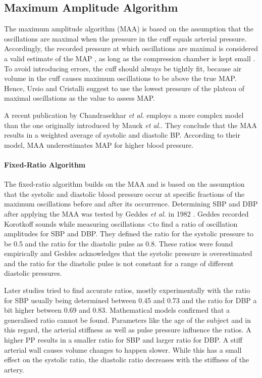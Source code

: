 \subsection{Maximum Amplitude Algorithm}
The maximum amplitude algorithm (MAA) is based on the assumption that the oscillations are maximal when the pressure in the cuff equals arterial pressure. Accordingly, the recorded pressure at which oscillations are maximal is considered a valid estimate of the MAP \cite{Babbs2012,Geddes1982,Drzewiecki1994}\cite{Ramsey1979}, as long as the compression chamber is kept small \cite{Mauck1980}. To avoid introducing errors, the cuff should always be tightly fit, because air volume in the cuff causes maximum oscillations to be above the true MAP. Hence, Ursio and Cristalli suggest to use the lowest pressure of the plateau of maximal oscillations as the value to assess MAP.\cite{Ursino1996}

A recent publication by Chandrasekhar \textit{et al.} \cite{Chandrasekhar2019} employs a more complex model than the one originally introduced by Mauck \textit{et al.}\cite{Mauck1980}. They conclude that the MAA results in a weighted average of systolic and diastolic BP. According to their model, MAA underestimates MAP for higher blood pressure.

\paragraph{Fixed-Ratio Algorithm} The fixed-ratio algorithm builds on the MAA and is based on the assumption that the systolic and diastolic blood pressure occur at specific fractions of the maximum oscillations before and after its occurrence. Determining SBP and DBP after applying the MAA was tested by Geddes \textit{et al.} in 1982 \cite{Geddes1982}. Geddes recorded Korotkoff sounds while measuring oscillations <to find a ratio of oscillation amplitudes for SBP and DBP. They defined the ratio for the systolic pressure to be 0.5 and the ratio for the diastolic pulse as 0.8. These ratios were found empirically and Geddes acknowledges that the systolic pressure is overestimated and the ratio for the diastolic pulse is not constant for a range of different diastolic pressures.

Later studies tried to find accurate ratios, mostly experimentally with the ratio for SBP usually being determined between 0.45 and 0.73 and the ratio for DBP a bit higher between 0.69 and 0.83.\cite{Drzewiecki1994,Forouzanfar2015} Mathematical models confirmed that a generalised ratio cannot be found. Parameters like the age of the subject and in this regard, the arterial stiffness as well as pulse pressure influence the ratios. \cite{Ursino1996} A higher PP results in a smaller ratio for SBP and larger ratio for DBP. A stiff arterial wall causes volume changes to happen slower. While this has a small effect on the systolic ratio, the diastolic ratio decreases with the stiffness of the artery.\cite{Babbs2012}

